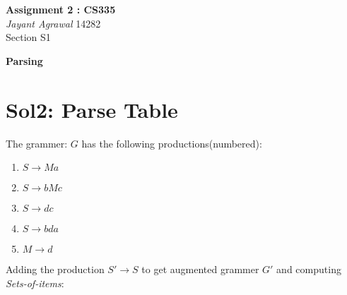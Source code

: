 \documentclass{article}
\begin{document}

\begin{center}
\textbf{\huge Assignment 2 : CS335} \\
\textit{\Large Jayant Agrawal}         14282 \\
Section S1
\end{center}

\textbf{\huge Parsing}

\section*{Sol2: Parse Table}
The grammer: $G$ has the following productions(numbered):
\begin{enumerate}
\item $S \rightarrow Ma$
\item $S \rightarrow bMc$
\item $S \rightarrow dc$
\item $S \rightarrow bda$
\item $M \rightarrow d$
\end{enumerate}
Adding the production $S' \rightarrow S$ to get augmented grammer $G'$ and computing \emph{Sets-of-items}:
\end{document}
